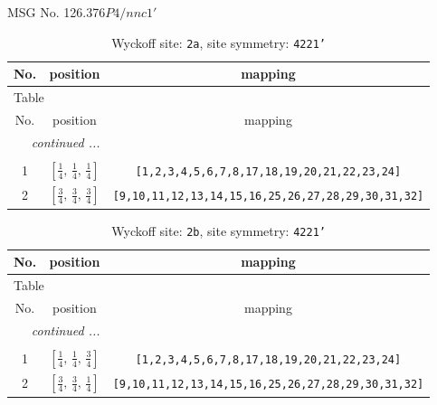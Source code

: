 \documentclass[fleqn,8pt]{jsarticle}
\begin{document}
\setcounter{MaxMatrixCols}{32}

\renewcommand{\tablename}{Table~}
\renewcommand{\figurename}{Figure~}
\begin{center}
\LARGE
MSG No. 126.376\quad$P4/nnc1'$
\end{center}
\renewcommand{\arraystretch}{1.2}
\begin{longtable}{ccc}
\caption{Wyckoff site: {\tt 2a}, site symmetry: {\tt 4221'}}
 \\
 \hline \hline
No. & position & mapping \\ \hline \endfirsthead

\multicolumn{2}{l}{\tablename\ \thetable{}} \\
 \hline \hline
No. & position & mapping \\ \hline \endhead

 \hline \hline
\multicolumn{2}{r}{\footnotesize\it continued ...} \\ \endfoot

 \hline \hline
\multicolumn{2}{r}{} \\ \endlastfoot

1 & $\left[ \frac{1}{4},\, \frac{1}{4},\, \frac{1}{4} \right]$ & {\tt [1,2,3,4,5,6,7,8,17,18,19,20,21,22,23,24]} \\ \hline
2 & $\left[ \frac{3}{4},\, \frac{3}{4},\, \frac{3}{4} \right]$ & {\tt [9,10,11,12,13,14,15,16,25,26,27,28,29,30,31,32]} \\
\end{longtable}
\renewcommand{\arraystretch}{1.2}
\begin{longtable}{ccc}
\caption{Wyckoff site: {\tt 2b}, site symmetry: {\tt 4221'}}
 \\
 \hline \hline
No. & position & mapping \\ \hline \endfirsthead

\multicolumn{2}{l}{\tablename\ \thetable{}} \\
 \hline \hline
No. & position & mapping \\ \hline \endhead

 \hline \hline
\multicolumn{2}{r}{\footnotesize\it continued ...} \\ \endfoot

 \hline \hline
\multicolumn{2}{r}{} \\ \endlastfoot

1 & $\left[ \frac{1}{4},\, \frac{1}{4},\, \frac{3}{4} \right]$ & {\tt [1,2,3,4,5,6,7,8,17,18,19,20,21,22,23,24]} \\ \hline
2 & $\left[ \frac{3}{4},\, \frac{3}{4},\, \frac{1}{4} \right]$ & {\tt [9,10,11,12,13,14,15,16,25,26,27,28,29,30,31,32]} \\
\end{longtable}
\end{document}
